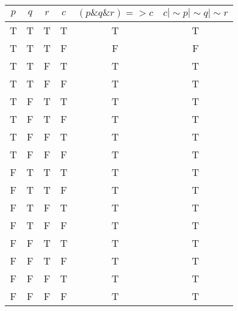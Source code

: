 \documentclass{article}
\begin{document}
\begin{tabular}{*{4}{c}|*{2}{c}}$p$&$q$&$r$&$c$&$(p \& q \& r) => c$&$c | \sim p | \sim q | \sim r$\\
\hline
T&T&T&T&T&T\\
T&T&T&F&F&F\\
T&T&F&T&T&T\\
T&T&F&F&T&T\\
T&F&T&T&T&T\\
T&F&T&F&T&T\\
T&F&F&T&T&T\\
T&F&F&F&T&T\\
F&T&T&T&T&T\\
F&T&T&F&T&T\\
F&T&F&T&T&T\\
F&T&F&F&T&T\\
F&F&T&T&T&T\\
F&F&T&F&T&T\\
F&F&F&T&T&T\\
F&F&F&F&T&T\\
\end{tabular}
\end{document}
